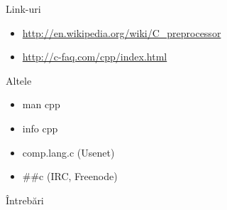 \documentclass{beamer}
\begin{document}
\begin{frame}{Link-uri}
	\begin{itemize}
		\item \url{http://en.wikipedia.org/wiki/C\_preprocessor}
		\item \url{http://c-faq.com/cpp/index.html}
	\end{itemize}
\end{frame}

\begin{frame}{Altele}
	\begin{itemize}
		\item man cpp
		\item info cpp
		\item comp.lang.c (Usenet)
		\item \#\#c (IRC, Freenode)
	\end{itemize}
\end{frame}

\begin{frame}{Întrebări}
\end{frame}
\end{document}
